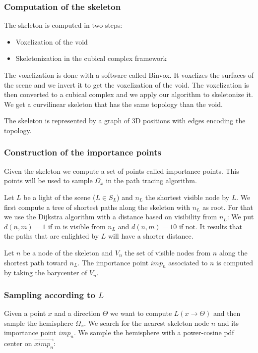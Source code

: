 \subsubsection{Computation of the skeleton}

The skeleton is computed in two steps:

\begin{itemize}
\item Voxelization of the void
\item Skeletonization in the cubical complex framework
\end{itemize}

The voxelization is done with a software called Binvox. It voxelizes the surfaces of the scene and we invert it to get the voxelization of the void. The voxelization is then converted to a cubical complex and we apply our algorithm to skeletonize it. We get a curvilinear skeleton that has the same topology than the void.

The skeleton is represented by a graph of 3D positions with edges encoding the topology.

\subsubsection{Construction of the importance points}

Given the skeleton we compute a set of points called importance points. This points will be used to sample $\Omega_x$ in the path tracing algorithm.

Let $L$ be a light of the scene ($L \in S_L$) and $n_L$ the shortest visible node by $L$. We first compute a tree of shortest paths along the skeleton with $n_L$ as root. For that we use the Dijkstra algorithm with a distance based on visibility from $n_L$: We put $d(n, m) = 1$ if $m$ is visible from $n_L$ and $d(n, m) = 10$ if not. It results that the paths that are enlighted by $L$ will have a shorter distance.

Let $n$ be a node of the skeleton and $V_n$ the set of visible nodes from $n$ along the shortest path toward $n_L$. The importance point $imp_n$ associated to $n$ is computed by taking the barycenter of $V_n$.

\subsubsection{Sampling according to $L$}

Given a point $x$ and a direction $\Theta$ we want to compute $L(x \rightarrow \Theta)$ and then sample the hemisphere $\Omega_x$. We search for the nearest skeleton node $n$ and its importance point $imp_n$. We sample the hemisphere with a power-cosine pdf center on $\vec{ximp_n}$:

